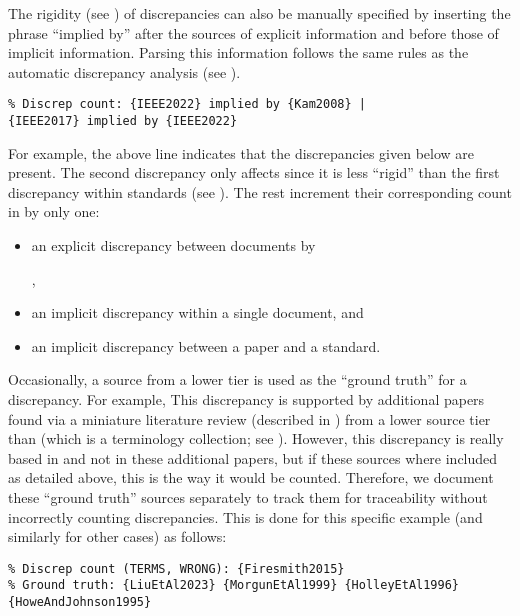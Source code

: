 The rigidity (see ) of discrepancies can also be manually
specified by inserting the phrase ``implied by'' after the sources of explicit
information and before those of implicit information. Parsing this information
follows the same rules as the automatic discrepancy analysis
(see ).
\begin{displayquote}
    \texttt{\% Discrep count: \{IEEE2022\} implied by \{Kam2008\} |\\
        \displayNL \{IEEE2017\} implied by \{IEEE2022\}}
\end{displayquote}
For example, the above line indicates that the discrepancies given below are
present. The second discrepancy only affects  since it
is less ``rigid'' than the first discrepancy within standards (see ).
The rest increment their corresponding count in
 by only one:
\begin{itemize}
    \item an explicit discrepancy between documents by
          \begin{NoHyper}\citeauthor{IEEE2022}\end{NoHyper},
    \item an implicit discrepancy within a single document, and
    \item an implicit discrepancy between a paper and a standard.
\end{itemize}

Occasionally, a source from a lower tier is used as the ``ground truth'' for a
discrepancy. For example, \tolTestingDiscrep*{} This discrepancy is supported
by additional papers found via a miniature literature review (described in
) from a lower source tier than \citep{Firesmith2015}
(which is a terminology collection; see ). However, this
discrepancy is really based in \citep{Firesmith2015} and not in these
additional papers, but if these sources where included as detailed above,
this is the way it would be counted. Therefore, we document these ``ground
truth'' sources separately to track them for traceability without incorrectly
counting discrepancies. This is done for this specific example (and similarly
for other cases) as follows:
\begin{displayquote}
    \texttt{\% Discrep count (TERMS, WRONG): \{Firesmith2015\}\\
        \% Ground truth: \{LiuEtAl2023\} \{MorgunEtAl1999\} \{HolleyEtAl1996\}
        \displayNL \{HoweAndJohnson1995\}}
\end{displayquote}

